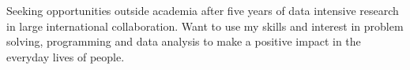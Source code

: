 

\begin{cvparagraph}

Seeking opportunities outside academia after five years of data intensive research in large international collaboration. 
Want to use my skills and interest in problem solving, programming and data analysis to make a positive impact in the everyday lives of people. 

\end{cvparagraph}